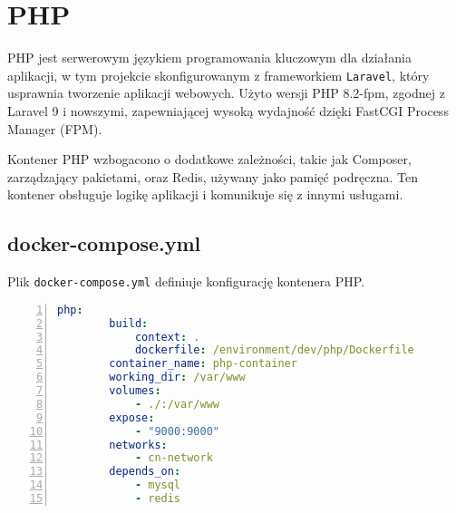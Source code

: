 \section{PHP}
PHP jest serwerowym językiem programowania kluczowym dla działania aplikacji, w tym projekcie skonfigurowanym z frameworkiem \verb|Laravel|, który usprawnia tworzenie aplikacji webowych. Użyto wersji PHP 8.2-fpm, zgodnej z Laravel 9 i nowszymi, zapewniającej wysoką wydajność dzięki FastCGI Process Manager (FPM).

Kontener PHP wzbogacono o dodatkowe zależności, takie jak Composer, zarządzający pakietami, oraz Redis, używany jako pamięć podręczna. Ten kontener obsługuje logikę aplikacji i komunikuje się z innymi usługami.
\subsection{docker-compose.yml}
Plik \verb|docker-compose.yml| definiuje konfigurację kontenera PHP.

\newpage
\begin{lstlisting}[language=yaml, caption={Konfiguracja kontenera php w pliku docker-compose.yml}, label={lst:docker_compose_php}, numbers=left, frame=single]
    php:
        build:
            context: .
            dockerfile: /environment/dev/php/Dockerfile
        container_name: php-container
        working_dir: /var/www
        volumes:
            - ./:/var/www
        expose:
            - "9000:9000"
        networks:
            - cn-network
        depends_on:
            - mysql
            - redis
\end{lstlisting}

